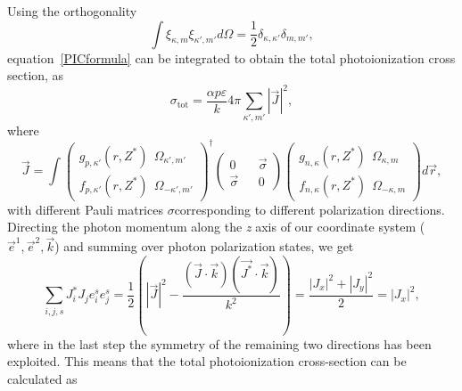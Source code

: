   Using the orthogonality
  \begin{equation}
    \int \xi_{\kappa,m}\xi_{\kappa',m'} d\Omega =
    \frac{1}{2}\delta_{\kappa,\kappa'}\delta_{m,m'},
  \end{equation}
  equation~\eqref{PICformula} can be integrated to obtain the total
  photoionization cross section, as
  \begin{equation}
    \sigma_{\mathrm{tot}} = \frac{\alpha p \varepsilon}{k} 4\pi
    \sum_{\kappa',m'} \left|\vec{J}\right|^2,
  \end{equation}
  where
  \begin{equation}
    \vec{J} = 
    \int\left(\begin{matrix}
        g_{p,\kappa'}(r,Z^*)~~
        \Omega_{\kappa',m'}
        \\
        f_{p,\kappa'}(r,Z^*)~~\Omega_{-\kappa',m'}
      \end{matrix}\right)^{\dagger}\left(\begin{matrix}
        0&&\vec{\sigma}
        \\
        \vec{\sigma}&&0
      \end{matrix}\right)\left(\begin{matrix}
        g_{n,\kappa}(r,Z^*)~~ \Omega_{\kappa,m}
        \\
        f_{n,\kappa}(r,Z^*)~~\Omega_{-\kappa,m}
      \end{matrix}\right) d\vec{r},
  \end{equation}
  with different Pauli matrices {$\sigma$}corresponding to different
  polarization directions. Directing the photon momentum along the
  {\it{z}} axis of our coordinate system
  ($\vec{e}^1, \vec{e}^2, \vec{k}$) and summing over photon
  polarization states, we get~\cite{lifshitz1974relativistic}
  \begin{equation}
    \sum_{i,j,s} J^*_i J_j e_i^s e_j^s
    =\frac{1}{2}\left(|\vec{J}|^2-\frac{(\vec{J} \cdot
        \vec{k})(\vec{J^*} \cdot \vec{k})}{k^2}\right) =
    \frac{|J_x|^2+|J_y|^2}{2} = |J_x|^2,
  \end{equation}
  where in the last step the symmetry of the
  remaining two directions has been exploited. This means that the total
  photoionization cross-section can be calculated as
